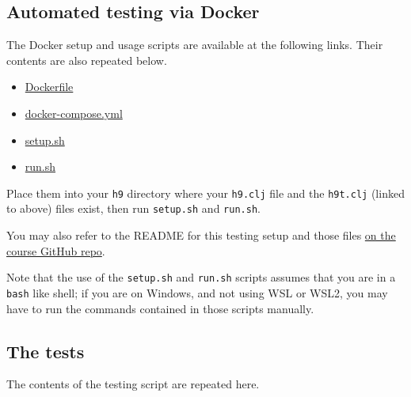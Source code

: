 \documentclass[11pt]{article}
\begin{document}
\subsection*{Automated testing via Docker}
\label{sec:org82bb06d}
The Docker setup and usage scripts are available at the following links.
Their contents are also repeated below.
\begin{itemize}
\item \href{./testing/h9/Dockerfile}{Dockerfile}
\item \href{./testing/h9/docker-compose.yml}{docker-compose.yml}
\item \href{./testing/h9/setup.sh}{setup.sh}
\item \href{./testing/h9/run.sh}{run.sh}
\end{itemize}
Place them into your \texttt{h9} directory where your \texttt{h9.clj} file
and the \texttt{h9t.clj} (linked to above) files exist,
then run \texttt{setup.sh} and \texttt{run.sh}.

You may also refer to the README
for this testing setup and those files
\href{https://github.com/armkeh/principles-of-programming-languages/tree/master/homework/testing/h5}{on the course GitHub repo}.

Note that the use of the \texttt{setup.sh} and \texttt{run.sh} scripts assumes
that you are in a \texttt{bash} like shell; if you are on Windows,
and not using WSL or WSL2, you may have
to run the commands contained in those scripts manually.

\subsection*{The tests}
\label{sec:org3a457b2}
The contents of the testing script are repeated here.
\end{document}
